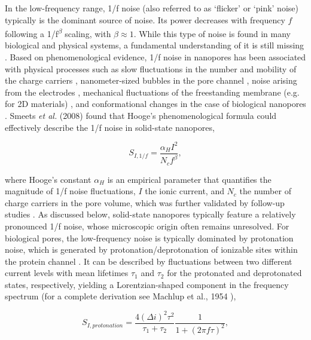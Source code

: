 In the low-frequency range, 1/f noise (also referred to as ‘flicker’ or ‘pink’ noise) typically is the dominant source of noise. Its power decreases with frequency $f$ following a 1/f\textsuperscript{$\beta$} scaling, with $\beta\approx 1$.  While this type of noise is found in many biological and physical systems, a fundamental understanding of it is still missing \cite{Milotti2002}. Based on phenomenological evidence, 1/f noise in nanopores has been associated with physical processes such as slow fluctuations in the number and mobility of the charge carriers \cite{Dutta1981,Zhang2018a,Jindal1981,Hooge1976}, nanometer-sized bubbles in the pore channel \cite{Smeets2006}, noise arising from the electrodes \cite{Wen2017}, mechanical fluctuations of the freestanding membrane (e.g. for 2D materials) \cite{Park2016,Heerema2015,Zhang2018}, and conformational changes in the case of biological nanopores \cite{Wohnsland1997,Bezrukov2000}. Smeets \emph{et al.} (2008) \cite{Smeets2008} found that Hooge’s phenomenological formula \cite{Hooge1976} could effectively describe the 1/f noise in solid-state \cite{Wen2017,Smeets2008,Smeets2009,Fragasso2019,Tasserit2010} nanopores, 



\begin{equation}\label{eqn:eq.3.1}
S_{I,1/f}=\frac{\alpha_H I^2}{N_c f^{\beta}},  
\end{equation}


\noindent where Hooge’s constant $\alpha_H$ is an empirical parameter that quantifies the magnitude of 1/f noise fluctuations, $I$ the ionic current, and $N_c$ the number of charge carriers in the pore volume, which was further validated by follow-up studies \cite{Wen2017,Smeets2009,Fragasso2019,Tasserit2010}. As discussed below, solid-state nanopores typically feature a relatively pronounced 1/f noise, whose microscopic origin often remains unresolved. For biological pores, the low-frequency noise is typically dominated by protonation noise, which is generated by protonation/de\-protonation of ionizable sites within the protein channel \cite{Nestorovich2003,Kasianowicz1993,Kasianowicz1995}. It  can be described by fluctuations between two different current levels with mean lifetimes $\tau_1$ and $\tau_2$ for the protonated and deprotonated states, respectively, yielding a Lorentzian-shaped component in the frequency spectrum (for a complete derivation see Machlup et al., 1954 \cite{Machlup1954}),


\begin{equation}\label{eqn:eq.3.2}
S_{I, protonation}=\frac{4(\Delta i)^2\tau^2}{\tau_1+\tau_2}\frac{1}{1+(2\pi f\tau)^2},
\end{equation}


